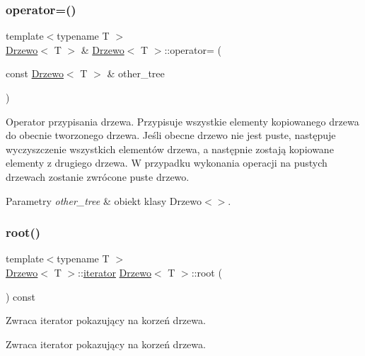 \subsubsection{\texorpdfstring{operator=()}{operator=()}}
{\footnotesize\ttfamily template$<$typename T $>$ \\
\hyperlink{class_drzewo}{Drzewo}$<$ T $>$ \& \hyperlink{class_drzewo}{Drzewo}$<$ T $>$\+::operator= (\begin{DoxyParamCaption}\item[{const \hyperlink{class_drzewo}{Drzewo}$<$ T $>$ \&}]{other\+\_\+tree }\end{DoxyParamCaption})}

Operator przypisania drzewa. Przypisuje wszystkie elementy kopiowanego drzewa do obecnie tworzonego drzewa. Jeśli obecne drzewo nie jest puste, następuje wyczyszczenie wszystkich elementów drzewa, a następnie zostają kopiowane elementy z drugiego drzewa. W przypadku wykonania operacji na pustych drzewach zostanie zwrócone puste drzewo.


\begin{DoxyParams}{Parametry}
{\em other\+\_\+tree} & obiekt klasy Drzewo$<$$>$. \\
\hline
\end{DoxyParams}
\mbox{\label{class_drzewo_a86f9dd2d9c43b63476cedc0bd14ee878}} 
\subsubsection{\texorpdfstring{root()}{root()}}
{\footnotesize\ttfamily template$<$typename T $>$ \\
\hyperlink{class_drzewo}{Drzewo}$<$ T $>$\+::\hyperlink{class_drzewo_1_1iterator}{iterator} \hyperlink{class_drzewo}{Drzewo}$<$ T $>$\+::root (\begin{DoxyParamCaption}{ }\end{DoxyParamCaption}) const\hspace{0.3cm}{\ttfamily [inline]}}

Zwraca iterator pokazujący na korzeń drzewa.

\begin{DoxyReturn}{Zwraca}
iterator pokazujący na korzeń drzewa. 
\end{DoxyReturn}
\mbox{\label{class_drzewo_a778ee17b16674b9d0577d22f5d55fa04}} 

